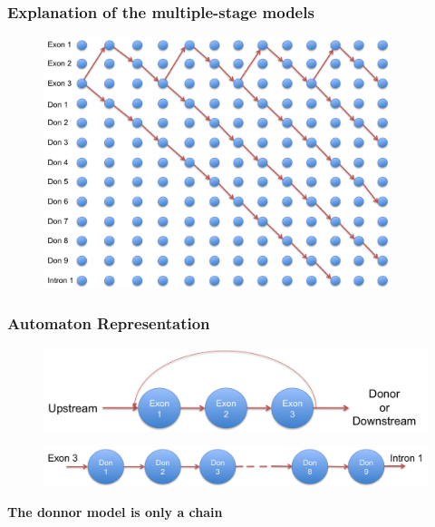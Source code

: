 \documentclass{beamer}[12pt]
\begin{document}
\begin{frame}
\frametitle{Explanation of the multiple-stage models}
	\begin{figure}
		\includegraphics[width=0.9\textwidth]{../picturesforthepresentation/Stages_viterbi.png}
	\end{figure}
	
\end{frame}


\begin{frame}
\frametitle{Automaton Representation}
	\begin{figure}
		\includegraphics[width=1.0\textwidth]{../picturesforthepresentation/exon_auto.png}
	\end{figure}
	\begin{figure}
		\includegraphics[width=1.0\textwidth]{../picturesforthepresentation/donnor_auto.png}
	\end{figure}
	\pause\begin{center}
		\textbf{The donnor model is only a chain}
	\end{center}
\end{frame}
\end{document}
